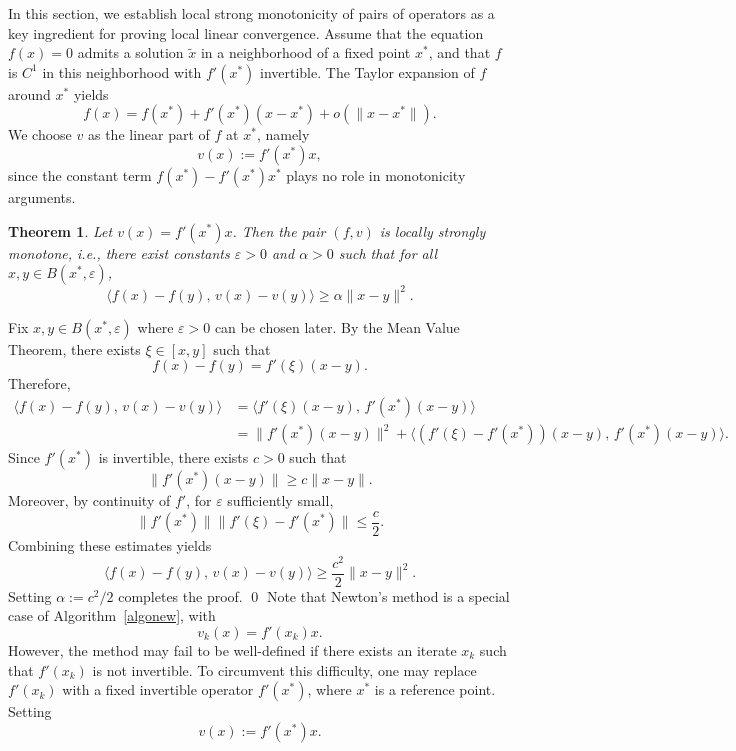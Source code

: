 \documentclass[11pt]{article}
\makeatletter
\renewenvironment{proof}[1][\proofname]{\par
	\normalfont
	\topsep0\p@\@plus3\p@ \trivlist
	\item[\hskip\labelsep\itshape
	#1\@addpunct{.}]\ignorespaces
}{%
	\qed\endtrivlist
}
\newtheorem{theorem}{Theorem}[section]
\theoremstyle{definition}
\theoremstyle{definition}
\theoremstyle{definition}
\newcommand{\tcr}{\textcolor{red}}
\def\tcr{ \textcolor{red}}
\makeatother
\begin{document}
In this section, we establish local strong monotonicity of pairs of operators as a key ingredient for proving local linear convergence.
Assume that the equation \( f(x) = 0 \) admits a solution \( \tilde{x} \) in a neighborhood of a fixed point \( x^* \), and that \( f \) is \( C^1 \) in this neighborhood with \( f'(x^*) \) invertible.
The Taylor expansion of \( f \) around \( x^* \) yields
\[
f(x) = f(x^*) + f'(x^*)(x - x^*) + o(\|x - x^*\|).
\]
We choose \( v \) as the linear part of \( f \) at \( x^* \), namely
\[
v(x) := f'(x^*)x,
\]
since the constant term \( f(x^*) - f'(x^*)x^* \) plays no role in monotonicity arguments.
\begin{theorem}\label{locs}
Let \( v(x) = f'(x^*)x \). Then the pair \( (f,v) \) is locally strongly monotone, i.e., there exist constants \( \varepsilon > 0 \) and \( \alpha > 0 \) such that for all
\( x, y \in B(x^*,\varepsilon) \),
\[
\langle f(x) - f(y),\, v(x) - v(y) \rangle
\ge \alpha \|x - y\|^2.
\]
\end{theorem}
\begin{proof}
Fix \( x, y \in B(x^*,\varepsilon) \) {where $\varepsilon>0$ can be chosen later}.
By the Mean Value Theorem, there exists \( \xi \in [x,y] \) such that
\[
f(x) - f(y) = f'(\xi)(x-y).
\]
Therefore,
\begin{align*}
\langle f(x) - f(y),\, v(x) - v(y) \rangle
&= \langle f'(\xi)(x-y),\, f'(x^*)(x-y) \rangle \\
&= \|f'(x^*)(x-y)\|^2
+ \langle (f'(\xi)-f'(x^*))(x-y),\, f'(x^*)(x-y) \rangle.
\end{align*}
Since \( f'(x^*) \) is invertible, there exists \( c > 0 \) such that
\[
\|f'(x^*)(x-y)\| \ge c \|x-y\|.
\]
Moreover, by continuity of \( f' \), for \( \varepsilon \) sufficiently small,
\[
{\| f'(x^*)\| }\|f'(\xi)-f'(x^*)\| \le \frac{c}{2}.
\]
Combining these estimates yields
\[
\langle f(x) - f(y),\, v(x) - v(y) \rangle
\ge \frac{c^2}{2} \|x-y\|^2.
\]
Setting \( \alpha := c^2/2 \) completes the proof.
\end{proof}
Note that Newton's method is a special case of Algorithm~\eqref{algonew}, with
\[
v_k(x) = f'(x_k)x.
\]
However, the method may fail to be well-defined if there exists an iterate \( x_k \) such that
\( f'(x_k) \) is not invertible. To circumvent this difficulty, one may replace
\( f'(x_k) \) with a fixed invertible operator \( f'(x^*) \), where \( x^* \) is a reference point.
Setting
\[
v(x) := f'(x^*)x.
\]
\end{document}
